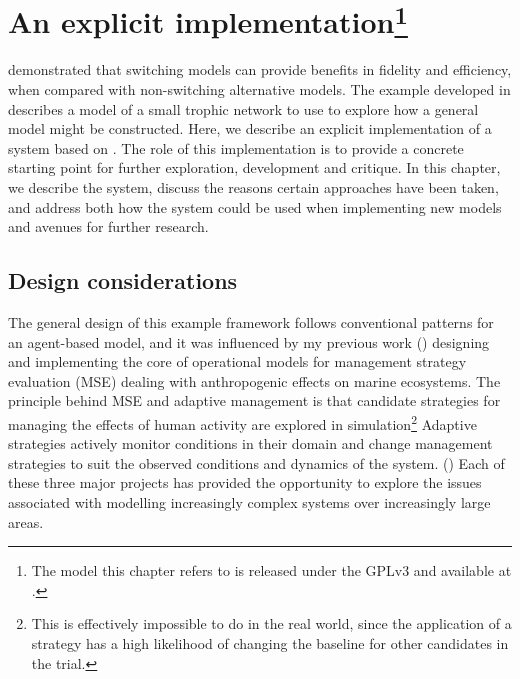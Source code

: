 

\chapter[AN EXPLICIT IMPLEMENTATION]{An explicit
implementation\footnote{The model this chapter refers to is released
under the GPLv3 and available at \repos.}}
\WeAreOn{\cfive}\label{explicitmodel}


\Ctwo demonstrated that switching models can provide benefits in
fidelity and efficiency, when compared with non-switching alternative
models.  The example developed in \Cthree describes a model of a small
trophic network to use to explore how a general model might be
constructed. Here, we describe an explicit implementation of a system
based on \Cthree. The role of this implementation is to provide a
concrete starting point for further exploration, development and
critique.  In this chapter, we describe the system, discuss the
reasons certain approaches have been taken, and address both how the
system could be used when implementing new models and avenues for
further research.

\section{Design considerations}
The general design of this example framework follows conventional
patterns for an agent-based model, and it was influenced by my
previous work (\cite{lyne1994pmez5, gray2006nws, gray2014}) designing
and implementing the core of operational models for management
strategy evaluation (MSE) dealing with anthropogenic effects on
marine ecosystems.  The principle behind MSE and adaptive management
is that candidate strategies for managing the effects of human
activity are explored in simulation\footnote{This is effectively
  impossible to do in the real world, since the application of a
  strategy has a high likelihood of changing the baseline for other
  candidates in the trial.} Adaptive strategies actively monitor
conditions in their domain and change management strategies to suit
the observed conditions and dynamics of the
system. (\cite{walters1976,smith1993,polacheck1999,sainsbury2000,keith2011})
Each of these three major projects has provided the opportunity to
explore the issues associated with modelling increasingly complex
systems over increasingly large areas.

